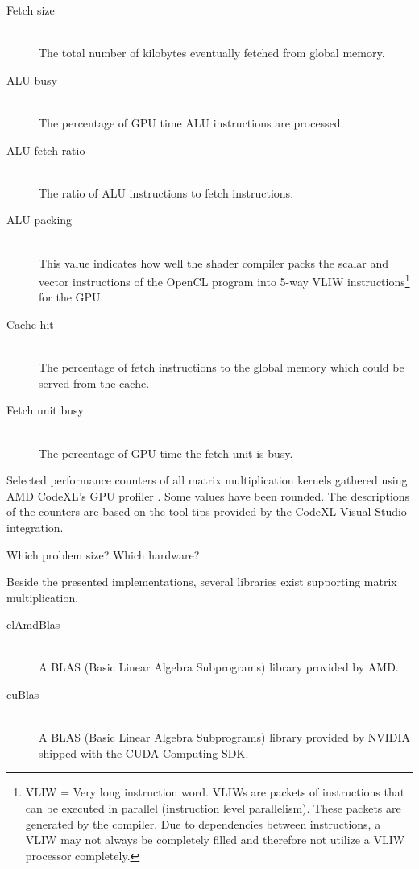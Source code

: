 \begin{table}
\begin{description}
		   \item[Fetch size] \hfill \\
		   The total number of kilobytes eventually fetched from global memory.
		   \item[ALU busy] \hfill \\
		   The percentage of GPU time ALU instructions are processed.
		   \item[ALU fetch ratio] \hfill \\
		   The ratio of ALU instructions to fetch instructions.
		   \item[ALU packing] \hfill \\
		   This value indicates how well the shader compiler packs the scalar and vector instructions of the OpenCL program into 5-way VLIW instructions\footnote{VLIW = Very long instruction word. VLIWs are packets of instructions that can be executed in parallel (instruction level parallelism). These packets are generated by the compiler. Due to dependencies between instructions, a VLIW may not always be completely filled and therefore not utilize a VLIW processor completely.} for the GPU.
		   \item[Cache hit] \hfill \\
		   The percentage of fetch instructions to the global memory which could be served from the cache.
		   \item[Fetch unit busy] \hfill \\
		   The percentage of GPU time the fetch unit is busy.
		\end{description}
	\caption{Selected performance counters of all matrix multiplication kernels gathered using AMD CodeXL's GPU profiler \cite{amd_codexl}. Some values have been rounded. The descriptions of the counters are based on the tool tips provided by the CodeXL Visual Studio integration.}
	\label{tbl:matrix_perf_counter}
\end{table}

Which problem size?
Which hardware?

Beside the presented implementations, several libraries exist supporting matrix multiplication.

\begin{description}
   \item[clAmdBlas] \hfill \\
   A BLAS (Basic Linear Algebra Subprograms) library provided by AMD.
   \item[cuBlas] \hfill \\
   A BLAS (Basic Linear Algebra Subprograms) library provided by NVIDIA shipped with the CUDA Computing SDK.
\end{description}

